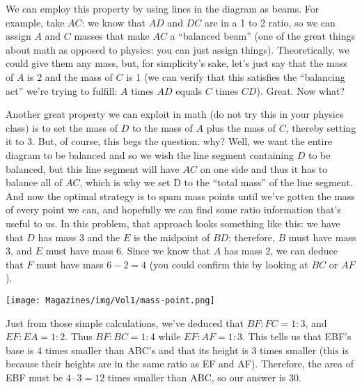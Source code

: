 \documentclass{article}
\begin{document}
\begin{multicols}{3}
We can employ this property by using lines in the diagram as beams. For example, take $AC$: we know that $AD$ and $DC$ are in a 1 to 2 ratio, so we can assign $A$ and $C$ masses that make $AC$ a ``balanced beam'' (one of the great things about math as opposed to physics: you can just assign things). Theoretically, we could give them any mass, but, for simplicity’s sake, let’s just say that the mass of $A$ is 2 and the mass of $C$ is 1 (we can verify that this satisfies the “balancing act” we’re trying to fulfill: $A$ times $AD$ equals $C$ times $CD$). Great. Now what?

Another great property we can exploit in math (do not try this in your physics class) is to set the mass of $D$ to the mass of $A$ plus the mass of $C$, thereby setting it to 3. But, of course, this begs the question: why? Well, we want the entire diagram to be balanced and so we wish the line segment containing $D$ to be balanced, but this line segment will have $AC$ on one side and thus it has to balance all of $AC$, which is why we set D to the “total mass” of the line segment. And now the optimal strategy is to spam mass points until we’ve gotten the mass of every point we can, and hopefully we can find some ratio information that’s useful to us. 
In this problem, that approach looks something like this: we have that $D$ has mass 3 and the $E$ is the midpoint of $BD$; therefore, $B$ must have mass 3, and $E$ must have mass 6. Since we know that $A$ has mass 2, we can deduce that $F$ must have mass $6 - 2 = 4$ (you could confirm this by looking at $BC$ or $AF$). 

\begin{center}
    \texttt{[image: Magazines/img/Vol1/mass-point.png]}
\end{center}

Just from those simple calculations, we’ve deduced that $BF : FC = 1 : 3$, and $EF : EA = 1 : 2$. Thus $BF : BC = 1 : 4$ while $EF : AF  = 1 : 3$. This tells us that EBF's base is 4 times smaller than ABC’s and that its height is 3 times smaller (this is because their heights are in the same ratio as EF and AF). Therefore, the area of EBF must be $4 \cdot 3 = 12$ times smaller than ABC, so our answer is 30. 



\end{multicols}
\end{document}
